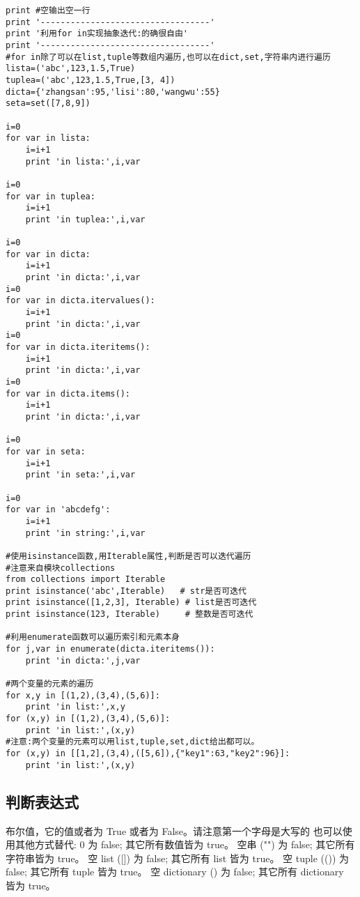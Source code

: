 \documentclass[twoside,11pt]{book}
\begin{document}
\begin{lstlisting}
print #空输出空一行
print '----------------------------------'
print '利用for in实现抽象迭代:的确很自由'
print '----------------------------------'
#for in除了可以在list,tuple等数组内遍历,也可以在dict,set,字符串内进行遍历
lista=('abc',123,1.5,True)
tuplea=('abc',123,1.5,True,[3, 4])
dicta={'zhangsan':95,'lisi':80,'wangwu':55}
seta=set([7,8,9])

i=0
for var in lista:
    i=i+1
    print 'in lista:',i,var

i=0
for var in tuplea:
    i=i+1
    print 'in tuplea:',i,var

i=0
for var in dicta:
    i=i+1
    print 'in dicta:',i,var
i=0
for var in dicta.itervalues():
    i=i+1
    print 'in dicta:',i,var
i=0
for var in dicta.iteritems():
    i=i+1
    print 'in dicta:',i,var
i=0
for var in dicta.items():
    i=i+1
    print 'in dicta:',i,var

i=0
for var in seta:
    i=i+1
    print 'in seta:',i,var

i=0
for var in 'abcdefg':
    i=i+1
    print 'in string:',i,var

#使用isinstance函数,用Iterable属性,判断是否可以迭代遍历
#注意来自模块collections
from collections import Iterable
print isinstance('abc',Iterable)   # str是否可迭代
print isinstance([1,2,3], Iterable) # list是否可迭代
print isinstance(123, Iterable)     # 整数是否可迭代

#利用enumerate函数可以遍历索引和元素本身
for j,var in enumerate(dicta.iteritems()):
    print 'in dicta:',j,var

#两个变量的元素的遍历
for x,y in [(1,2),(3,4),(5,6)]:
    print 'in list:',x,y
for (x,y) in [(1,2),(3,4),(5,6)]:
    print 'in list:',(x,y)
#注意:两个变量的元素可以用list,tuple,set,dict给出都可以。
for (x,y) in [[1,2],(3,4),([5,6]),{"key1":63,"key2":96}]:
    print 'in list:',(x,y)

\end{lstlisting}

\subsection{判断表达式}

布尔值，它的值或者为 True 或者为 False。请注意第一个字母是大写的
也可以使用其他方式替代:
0 为 false; 其它所有数值皆为 true。
空串 ("") 为 false; 其它所有字符串皆为 true。
空 list ([]) 为 false; 其它所有 list 皆为 true。
空 tuple (()) 为 false; 其它所有 tuple 皆为 true。
空 dictionary ({}) 为 false; 其它所有 dictionary 皆为 true。
\end{document}
